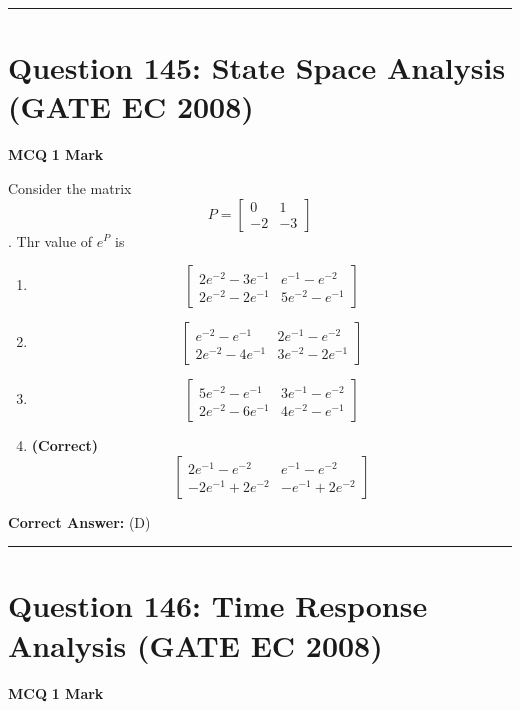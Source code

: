 \documentclass[11pt,a4paper]{article}
\begin{document}
\vspace{1.5em}
\hrule
\vspace{1.5em}

\section*{Question 145: State Space Analysis (GATE EC 2008)}
\noindent \textbf{\color{primary}MCQ} \hfill \textbf{\color{secondary}1 Mark}


\noindent Consider the matrix 
\[
P=\begin{bmatrix} 0 & 1\\ -2&-3 \end{bmatrix}
\]
. Thr value of $e^{P}$ is


\begin{enumerate}[label=(\Alph*)]
    \item \[
\begin{bmatrix} 2 e^{-2}-3e^{-1}&e^{-1}-e^{-2} \\ 2e^{-2}-2e^{-1}& 5e^{-2}-e^{-1} \end{bmatrix}
\]
    \item \[
\begin{bmatrix}  e^{-2}-e^{-1}&2e^{-1}-e^{-2} \\ 2e^{-2}-4e^{-1}& 3e^{-2}-2e^{-1} \end{bmatrix}
\]
    \item \[
\begin{bmatrix} 5 e^{-2}-e^{-1}&3e^{-1}-e^{-2} \\ 2e^{-2}-6e^{-1}& 4e^{-2}-e^{-1} \end{bmatrix}
\]
    \item \textbf{(Correct)} \[
\begin{bmatrix} 2 e^{-1}-e^{-2}& e^{-1}-e^{-2} \\ -2e^{-1}+2e^{-2}& -e^{-1}+2e^{-2} \end{bmatrix}
\]
\end{enumerate}

\noindent \textbf{Correct Answer:} (D)


\vspace{1.5em}
\hrule
\vspace{1.5em}

\section*{Question 146: Time Response Analysis (GATE EC 2008)}
\noindent \textbf{\color{primary}MCQ} \hfill \textbf{\color{secondary}1 Mark}
\end{document}
